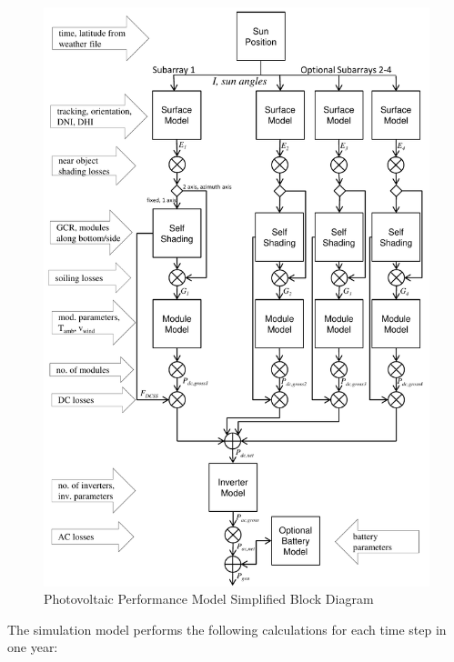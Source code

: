\documentclass[12pt,letterpaper]{article}
\begin{document}
\begin{figure}
\begin{center}
\includegraphics[scale=0.88]{pvsam-schematic}
\caption{Photovoltaic Performance Model Simplified Block Diagram}
\label{fig-pvsamschematic}
\end{center}
\end{figure}
 
The simulation model performs the following calculations for each time step in one year:
\end{document}
